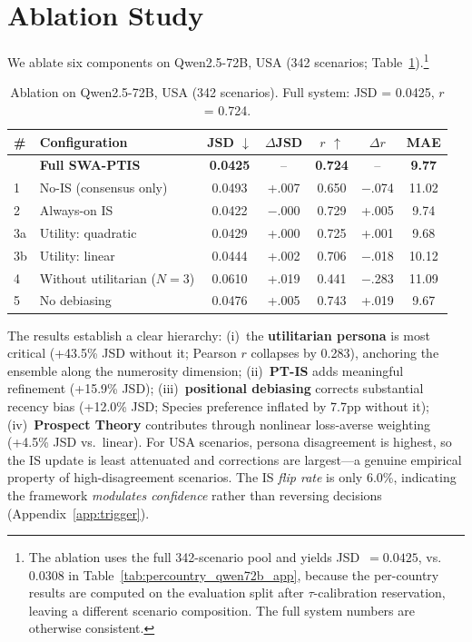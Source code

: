 \documentclass{article}
\newcommand{\gain}[1]{\textcolor{improvegreen}{#1}}
\newcommand{\loss}[1]{\textcolor{worsered}{#1}}
\begin{document}
\section{Ablation Study}
\label{sec:ablation}

We ablate six components on Qwen2.5-72B, USA (342 scenarios;
Table~\ref{tab:ablation}).\footnote{The ablation uses the full 342-scenario
pool and yields JSD~$=0.0425$, vs.\ $0.0308$ in
Table~\ref{tab:percountry_qwen72b_app}, because the per-country results are
computed on the evaluation split after $\tau$-calibration reservation, leaving a
different scenario composition. The full system numbers are otherwise
consistent.}

\begin{table}[t]
\caption{Ablation on Qwen2.5-72B, USA (342 scenarios). Full system:
JSD = 0.0425, $r$ = 0.724.}
\label{tab:ablation}
\centering\small
\setlength{\tabcolsep}{4pt}
\begin{tabular}{llccccc}
\toprule
\# & Configuration & JSD $\downarrow$ & $\Delta$JSD & $r$ $\uparrow$ & $\Delta r$ & MAE \\
\midrule
  & \textbf{Full SWA-PTIS} & \textbf{0.0425} & -- & \textbf{0.724} & -- & \textbf{9.77} \\
\midrule
1 & No-IS (consensus only) & 0.0493 & \loss{+.007} & 0.650 & \loss{$-$.074} & 11.02 \\
2 & Always-on IS & 0.0422 & \gain{$-$.000} & 0.729 & \gain{+.005} & 9.74 \\
3a & Utility: quadratic & 0.0429 & \loss{+.000} & 0.725 & +.001 & 9.68 \\
3b & Utility: linear & 0.0444 & \loss{+.002} & 0.706 & \loss{$-$.018} & 10.12 \\
4 & Without utilitarian ($N{=}3$) & 0.0610 & \loss{+.019} & 0.441 & \loss{$-$.283} & 11.09 \\
5 & No debiasing & 0.0476 & \loss{+.005} & 0.743 & +.019 & 9.67 \\
\bottomrule
\end{tabular}
\end{table}

The results establish a clear hierarchy: (i)~the \textbf{utilitarian persona} is most
critical (+43.5\% JSD without it; Pearson $r$ collapses by 0.283), anchoring the
ensemble along the numerosity dimension; (ii)~\textbf{PT-IS} adds meaningful
refinement (+15.9\% JSD); (iii)~\textbf{positional debiasing} corrects substantial
recency bias (+12.0\% JSD; Species preference inflated by 7.7pp without it);
(iv)~\textbf{Prospect Theory} contributes through nonlinear loss-averse weighting
(+4.5\% JSD vs.\ linear). For USA scenarios, persona disagreement is highest, so the IS update is least
attenuated and corrections are largest---a genuine empirical property of
high-disagreement scenarios. The IS \emph{flip rate} is only 6.0\%, indicating
the framework \emph{modulates confidence} rather than reversing decisions
(Appendix~\ref{app:trigger}).
\end{document}
